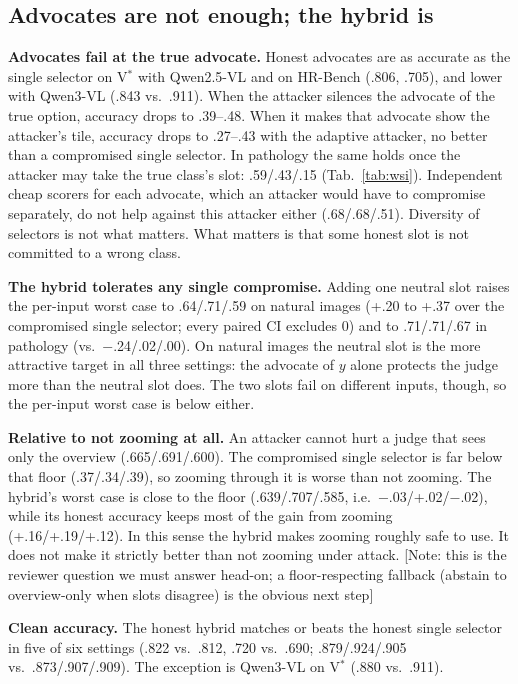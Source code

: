 \documentclass[10pt,twocolumn,letterpaper]{article}
\newcommand{\note}[1]{{\color{blue}[Note: #1]}}
\begin{document}
\subsection{Advocates are not enough; the hybrid is}\label{sec:hybrid}
\textbf{Advocates fail at the true advocate.} Honest advocates are as accurate as the single selector on V$^*$ with Qwen2.5-VL and on HR-Bench (.806, .705), and lower with Qwen3-VL (.843 vs.\ .911). When the attacker silences the advocate of the true option, accuracy drops to .39--.48. When it makes that advocate show the attacker's tile, accuracy drops to .27--.43 with the adaptive attacker, no better than a compromised single selector. In pathology the same holds once the attacker may take the true class's slot: .59/.43/.15 (Tab.~\ref{tab:wsi}). Independent cheap scorers for each advocate, which an attacker would have to compromise separately, do not help against this attacker either (.68/.68/.51). Diversity of selectors is not what matters. What matters is that some honest slot is not committed to a wrong class.

\textbf{The hybrid tolerates any single compromise.} Adding one neutral slot raises the per-input worst case to .64/.71/.59 on natural images (+.20 to +.37 over the compromised single selector; every paired CI excludes 0) and to .71/.71/.67 in pathology (vs.\ $-$.24/.02/.00). On natural images the neutral slot is the more attractive target in all three settings: the advocate of $y$ alone protects the judge more than the neutral slot does. The two slots fail on different inputs, though, so the per-input worst case is below either.

\textbf{Relative to not zooming at all.} An attacker cannot hurt a judge that sees only the overview (.665/.691/.600). The compromised single selector is far below that floor (.37/.34/.39), so zooming through it is worse than not zooming. The hybrid's worst case is close to the floor (.639/.707/.585, i.e.\ $-$.03/+.02/$-$.02), while its honest accuracy keeps most of the gain from zooming (+.16/+.19/+.12). In this sense the hybrid makes zooming roughly safe to use. It does not make it strictly better than not zooming under attack. \note{this is the reviewer question we must answer head-on; a floor-respecting fallback (abstain to overview-only when slots disagree) is the obvious next step}

\textbf{Clean accuracy.} The honest hybrid matches or beats the honest single selector in five of six settings (.822 vs.\ .812, .720 vs.\ .690; .879/.924/.905 vs.\ .873/.907/.909). The exception is Qwen3-VL on V$^*$ (.880 vs.\ .911).
\end{document}
